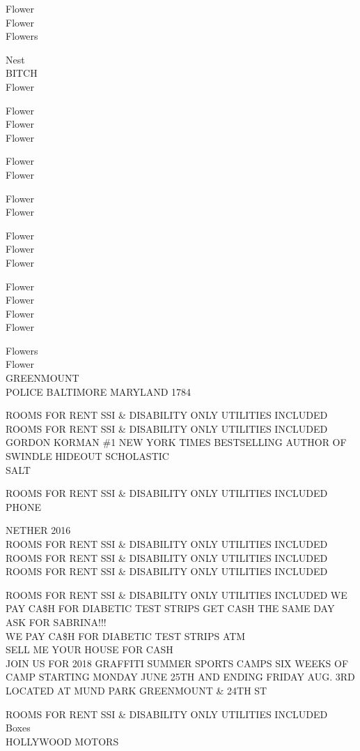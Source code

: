 \documentclass[10pt,letterpaper]{article}
\begin{document}
Flower\\
Flower\\
Flowers

Nest\\
BITCH\\
Flower

Flower\\
Flower\\
Flower

Flower\\
Flower

Flower\\
Flower

Flower\\
Flower\\
Flower

Flower\\
Flower\\
Flower\\
Flower

Flowers\\
Flower\\
GREENMOUNT\\
POLICE BALTIMORE MARYLAND 1784

ROOMS FOR RENT SSI \& DISABILITY ONLY UTILITIES INCLUDED\\
ROOMS FOR RENT SSI \& DISABILITY ONLY UTILITIES INCLUDED\\
GORDON KORMAN \#1 NEW YORK TIMES BESTSELLING AUTHOR OF SWINDLE HIDEOUT SCHOLASTIC\\
SALT

ROOMS FOR RENT SSI \& DISABILITY ONLY UTILITIES INCLUDED\\
PHONE

NETHER 2016\\
ROOMS FOR RENT SSI \& DISABILITY ONLY UTILITIES INCLUDED\\
ROOMS FOR RENT SSI \& DISABILITY ONLY UTILITIES INCLUDED\\
ROOMS FOR RENT SSI \& DISABILITY ONLY UTILITIES INCLUDED

ROOMS FOR RENT SSI \& DISABILITY ONLY UTILITIES INCLUDED WE PAY CA\$H FOR DIABETIC TEST STRIPS GET CASH THE SAME DAY ASK FOR SABRINA!!!\\
WE PAY CA\$H FOR DIABETIC TEST STRIPS ATM\\
SELL ME YOUR HOUSE FOR CASH\\
JOIN US FOR 2018 GRAFFITI SUMMER SPORTS CAMPS SIX WEEKS OF CAMP STARTING MONDAY JUNE 25TH AND ENDING FRIDAY AUG. 3RD LOCATED AT MUND PARK GREENMOUNT \& 24TH ST

ROOMS FOR RENT SSI \& DISABILITY ONLY UTILITIES INCLUDED\\
Boxes\\
HOLLYWOOD MOTORS
\end{document}
